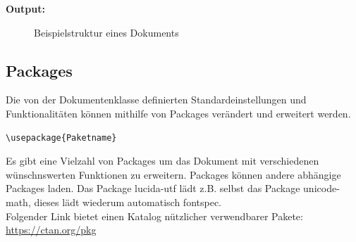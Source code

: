 \textbf{Output:}
\begin{figure}[H]
    \centering
    \setlength{\fboxsep}{0pt}%
    \setlength{\fboxrule}{2pt}%
    \caption[Dokumentenstruktur]{Beispielstruktur eines Dokuments}
    \label{fig:dokumentenstruktur}
\end{figure}

\subsection{Packages}
Die von der Dokumentenklasse definierten Standardeinstellungen und Funktionalitäten können mithilfe von Packages verändert und erweitert werden.
\begin{verbatim}
\usepackage{Paketname}
\end{verbatim}
Es gibt eine Vielzahl von Packages um das Dokument mit verschiedenen wünschnswerten Funktionen zu erweitern.
Packages können andere abhängige Packages laden.
Das Package lucida-utf lädt z.B. selbst das Package unicode-math, dieses lädt wiederum automatisch fontspec. \cite[vgl.][S.91ff]{Lamport1994}\\
Folgender Link bietet einen Katalog nützlicher verwendbarer Pakete: \\
\url{https://ctan.org/pkg}

